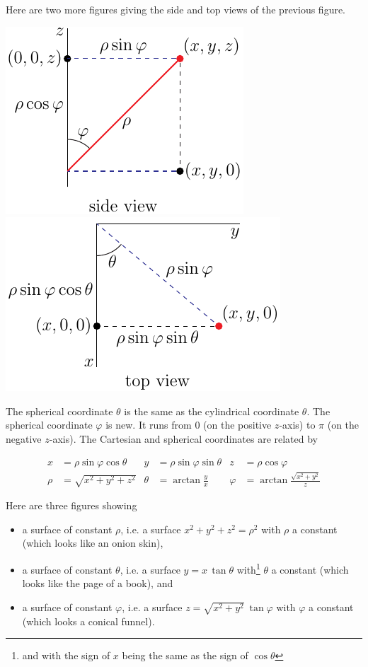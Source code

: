 Here are two more figures giving the side and top views of the 
previous figure.
\begin{efig}
\begin{center}
    \includegraphics{figures/coord/sphericalSide.pdf}\qquad
    \includegraphics{figures/coord/sphericalTop.pdf}\qquad
\end{center}
\end{efig}
The spherical coordinate $\theta$ is the same as the cylindrical coordinate
$\theta$. The spherical coordinate $\varphi$ is new. It runs from $0$
(on the positive $z$-axis) to $\pi$ (on the negative $z$-axis).
The Cartesian and spherical coordinates
are related by
\begin{impeqn}\label{eqn spherical}
\begin{align*}
x&=\rho\sin\varphi\cos\theta &
y&=\rho\sin\varphi\sin\theta &
z&=\rho\cos\varphi \\
 \rho&=\sqrt{x^2+y^2+z^2} &
 \theta&=\arctan\frac{y}{x} &
 \varphi&=\arctan\frac{\sqrt{x^2+y^2}}{z}
\end{align*}
\end{impeqn}
Here are three figures showing
\begin{itemize}
\item
a surface of constant $\rho$, i.e. a surface $x^2+y^2+z^2=\rho^2$
with $\rho$ a constant (which looks like an onion skin), 
\item
a surface of constant $\theta$, i.e. a surface $y= x\,\tan\theta$
with\footnote{and with the sign of $x$ being the same as the sign of $\cos\theta$} $\theta$ a constant (which looks like the page of a book), and 
\item
a surface of constant $\varphi$, i.e. a surface
$z=\sqrt{x^2+y^2}\ \tan\varphi$ with $\varphi$ a constant 
(which looks a conical funnel).
\end{itemize}
